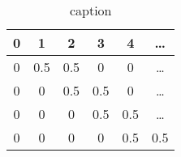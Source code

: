 \begin{table}[H]
	\centering
	\caption{caption}
	\label{tab:label}
	\begin{tabular}{|c|c|c|c|c|c|}
		\hline
		0 & 1 & 2 & 3 & 4 & \ldots \\
		\hline
		0 & 0.5 & 0.5 & 0 & 0 & \ldots \\
		0 & 0 & 0.5 & 0.5 & 0 & \ldots \\
		0 & 0 & 0 & 0.5 & 0.5 & \ldots \\
		0 & 0 & 0 & 0 & 0.5 & 0.5 \\
		\hline
	\end{tabular}
\end{table}
